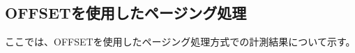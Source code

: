 \documentclass[../../../main]{subfiles}
\begin{document}
    \subsection{OFFSETを使用したページング処理}\label{subsec:result-paging-offset}

    ここでは、OFFSETを使用したページング処理方式での計測結果について示す。

    
    
    

    

    

    
\end{document}
